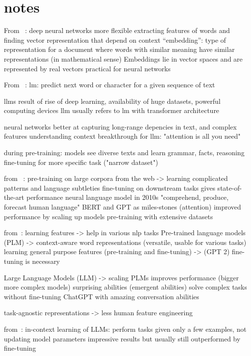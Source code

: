 \section{notes}

From ~\autocite{quadarLM2020}:
deep neural networks more flexible
extracting features of words and finding vector representation that depend on context
\enquote{embedding}: type of representation for a document where words with similar meaning have similar representations (in mathematical sense)
Embeddings lie in vector spaces and are represented by real vectors
practical for neural networks

From ~\autocite{Hadi_2023}:
\gls{lm}: predict next word or character for a given sequence of text

\gls{llm}s result of rise of deep learning, availability of huge datasets, powerful computing devices
\gls{llm} usually refers to lm with transformer architecture

neural networks better at capturing long-range depencies in text, and complex features
understanding context
breakthrough for llm: "attention is all you need"

during pre-training: models see diverse texts and learn grammar, facts, reasoning
fine-tuning for more specific task ("narrow dataset")

from ~\autocite{Raiaan2024ARO}:
pre-training on large corpora from the web -> learning complicated patterns and language subtleties
fine-tuning on downstream tasks gives state-of-the-art performance
neural language model in 2010s
"comprehend, produce, forecast human language"
BERT and GPT as miles-stones (attention)
improved performance by scaling up models
pre-training with extensive datasets

from~\autocite{zhao2023survey}:
learning features -> help in various nlp tasks
Pre-trained language models (PLM) -> context-aware word representations (versatile, usable for various tasks)
learning general purpose features (pre-training and fine-tuning) -> (GPT 2)
fine-tuning is necessary

Large Language Models (LLM) -> scaling PLMs improves performance (bigger more complex models)
surprising abilities (emergent abilities)
solve complex tasks without fine-tuning
ChatGPT with amazing conversation abilities

task-agnostic representations -> less human feature engineering

from~\autocite{bhatia2023tart}:
in-context learning of LLMs: perform tasks given only a few examples, not updating model parameters
impressive results but usually still outperformed by fine-tuning

